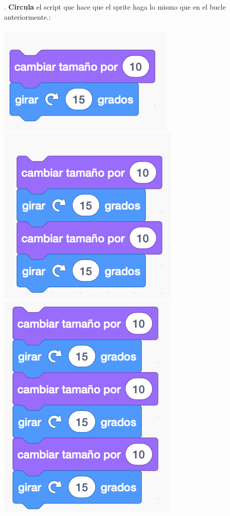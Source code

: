 \documentclass[letterpaper,12pt]{article}
\begin{document}
. \textbf{Circula} el script que hace que el sprite haga lo mismo que en el bucle anteriormente.: \\ \\
\includegraphics[scale=.6,valign=t]{q2_script1.png} \hspace{1.25cm}
\includegraphics[scale=.6,valign=t]{q2_script2.png} \hspace{1.25cm}
\includegraphics[scale=.6,valign=t]{q2_script3.png} \hspace{1.25cm}
\end{document}
